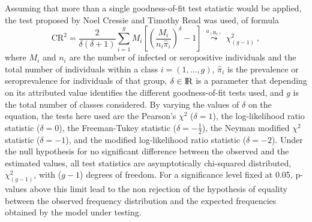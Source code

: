 Assuming that more than a single goodness-of-fit test statistic would be applied, the test proposed by Noel Cressie and Timothy Read \cite{cressie1984multinomial} was used, of formula
%
\begin{equation}
    \label{eq:cressie.read}
    \text{CR}^2 = \frac{2}{\delta(\delta+1)} \sum_{i=1}^g M_i \left[ \left(\frac{M_i}{n_i\widehat{\pi}_i}\right)^\delta-1\right]\ \overset{a_{\left(\text{H}_0\right)}}{\leadsto}\    \chi_{(g-1)}^{2}\ ,
\end{equation}
%
\noindent
where $M_i$ and $n_i$ are the number of infected or seropositive individuals and the total number of individuals within a class $i=(1,\dots,g)$, $\widehat{\pi}_i$ is the prevalence or seroprevalence for individuals of that group, $\delta \in \rm I\!R$ is a parameter that depending on its attributed value identifies the different goodness-of-fit tests used, and $g$ is the total number of classes considered.
By varying the values of $\delta$ on the equation, the tests here used are the Pearson's $\chi^2$ ($\delta=1$), the log-likelihood ratio statistic ($\delta=0$), the Freeman-Tukey statistic ($\delta=\textstyle-\frac{1}{2}$), the Neyman modified $\chi^2$ statistic ($\delta=-1$), and the modified log-likelihood ratio statistic ($\delta=-2$).
Under the null hypothesis for no significant difference between the observed and the estimated values, all test statistics are asymptotically chi-squared distributed, $\chi_{(g-1)}^{2}$, with ($g-1$) degrees of freedom.
For a significance level fixed at 0.05, p-values above this limit lead to the non rejection of the hypothesis of equality between the observed frequency distribution and the expected frequencies obtained by the model under testing.
%
